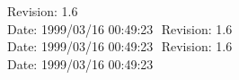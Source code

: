 %
%
%
%
%
%
%
%
%
%
%
%
%
  {\LARGE $ $Revision: 1.6 $ $}  \\[5mm] %
  {\LARGE $ $Date: 1999/03/16 00:49:23 $ $}  %
%
%
%
%
  {\LARGE $ $Revision: 1.6 $ $}  \\[5mm] %
  {\LARGE $ $Date: 1999/03/16 00:49:23 $ $}  %
%
  {\LARGE $ $Revision: 1.6 $ $}  \\[5mm] %
  {\LARGE $ $Date: 1999/03/16 00:49:23 $ $}  %
%
